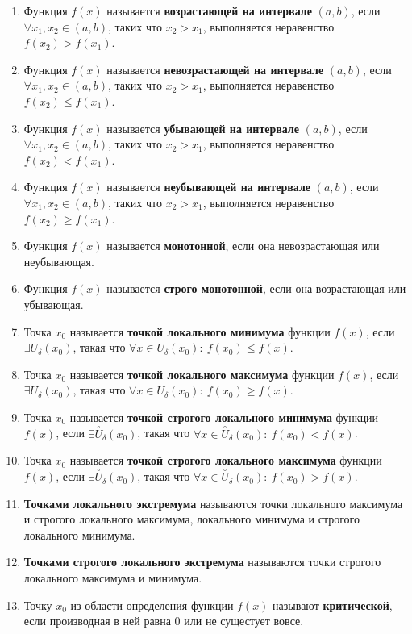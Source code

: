 \begin{enumerate}
\item Функция $f(x)$ называется \textbf{возрастающей на интервале} $(a, b)$, если $\forall x_1, x_2 \in (a, b)$, таких что $x_2 > x_1$, выполняется неравенство $f(x_2)>f(x_1)$.
\item Функция $f(x)$ называется \textbf{невозрастающей на интервале} $(a, b)$, если $\forall x_1, x_2 \in (a, b)$, таких что $x_2 > x_1$, выполняется неравенство $f(x_2)\leqslant f(x_1)$.
\item Функция $f(x)$ называется \textbf{убывающей на интервале} $(a, b)$, если $\forall x_1, x_2 \in (a, b)$, таких что $x_2 > x_1$, выполняется неравенство $f(x_2)<f(x_1)$.
\item Функция $f(x)$ называется \textbf{неубывающей на интервале} $(a, b)$, если $\forall x_1, x_2 \in (a, b)$, таких что $x_2 > x_1$, выполняется неравенство $f(x_2)\geqslant f(x_1)$.
\item Функция $f(x)$ называется \textbf{монотонной}, если она невозрастающая или неубывающая.
\item Функция $f(x)$ называется \textbf{строго монотонной}, если она возрастающая или убывающая.
\item Точка $x_0$ называется \textbf{точкой локального минимума} функции $f(x)$, если $\exists U_{\delta}(x_0)$, такая что $\forall x \in U_{\delta}(x_0): \ f(x_0) \leqslant f(x)$.
\item Точка $x_0$ называется \textbf{точкой локального максимума} функции $f(x)$, если $\exists U_{\delta}(x_0)$, такая что $\forall x \in U_{\delta}(x_0): \ f(x_0) \geqslant f(x)$.
\item Точка $x_0$ называется \textbf{точкой строгого локального минимума} функции $f(x)$, если $\exists \overset{\circ}{U}_{\delta}(x_0)$, такая что $\forall x \in \overset{\circ}{U}_{\delta}(x_0): \ f(x_0) < f(x)$.
\item Точка $x_0$ называется \textbf{точкой строгого локального максимума} функции $f(x)$, если $\exists \overset{\circ}{U}_\delta(x_0)$, такая что $\forall x \in \overset{\circ}{U}_\delta(x_0): \ f(x_0) > f(x)$.
\item \textbf{Точками локального экстремума} называются точки локального максимума и строгого локального максимума, локального минимума и строгого локального минимума.
\item \textbf{Точками строгого локального экстремума} называются точки строгого локального максимума и минимума.
\item Точку $x_0$ из области определения функции $f(x)$ называют \textbf{критической}, если производная в ней равна 0 или не сущестует вовсе.

\end{enumerate}

